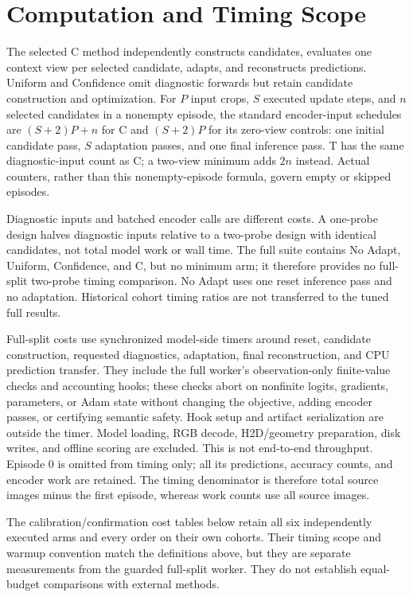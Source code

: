 \section{Computation and Timing Scope}
\label{app:cost}
The selected C method independently constructs candidates, evaluates one context view per selected candidate, adapts, and reconstructs predictions. Uniform and Confidence omit diagnostic forwards but retain candidate construction and optimization. For $P$ input crops, $S$ executed update steps, and $n$ selected candidates in a nonempty episode, the standard encoder-input schedules are $(S+2)P+n$ for C and $(S+2)P$ for its zero-view controls: one initial candidate pass, $S$ adaptation passes, and one final inference pass. T has the same diagnostic-input count as C; a two-view minimum adds $2n$ instead. Actual counters, rather than this nonempty-episode formula, govern empty or skipped episodes.

Diagnostic inputs and batched encoder calls are different costs. A one-probe design halves diagnostic inputs relative to a two-probe design with identical candidates, not total model work or wall time. The full suite contains No Adapt, Uniform, Confidence, and C, but no minimum arm; it therefore provides no full-split two-probe timing comparison. No Adapt uses one reset inference pass and no adaptation. Historical cohort timing ratios are not transferred to the tuned full results.

Full-split costs use synchronized model-side timers around reset, candidate construction, requested diagnostics, adaptation, final reconstruction, and CPU prediction transfer. They include the full worker's observation-only finite-value checks and accounting hooks; these checks abort on nonfinite logits, gradients, parameters, or Adam state without changing the objective, adding encoder passes, or certifying semantic safety. Hook setup and artifact serialization are outside the timer. Model loading, RGB decode, H2D/geometry preparation, disk writes, and offline scoring are excluded. This is not end-to-end throughput. Episode 0 is omitted from timing only; all its predictions, accuracy counts, and encoder work are retained. The timing denominator is therefore total source images minus the first episode, whereas work counts use all source images.



The calibration/confirmation cost tables below retain all six independently executed arms and every order on their own cohorts. Their timing scope and warmup convention match the definitions above, but they are separate measurements from the guarded full-split worker. They do not establish equal-budget comparisons with external methods.

